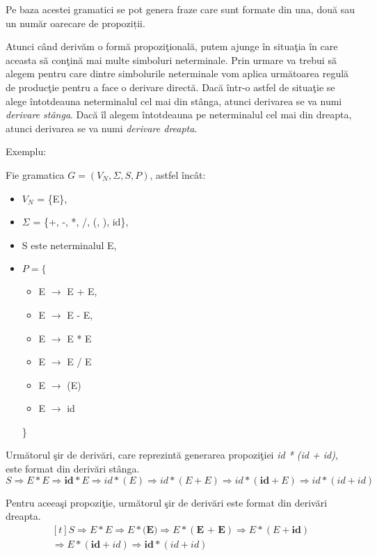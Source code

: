 Pe baza acestei gramatici se pot genera fraze care sunt formate din una, două sau un număr oarecare de propoziții.

Atunci când derivăm o formă propoziţională, putem ajunge în situaţia în care aceasta să conţină mai multe simboluri neterminale. Prin urmare va trebui să alegem pentru care dintre simbolurile neterminale vom aplica următoarea regulă de producţie pentru a face o derivare directă. Dacă într-o astfel de situaţie se alege întotdeauna neterminalul cel mai din stânga, atunci derivarea se va numi \textit{derivare stânga}. Dacă îl alegem întotdeauna pe neterminalul cel mai din dreapta, atunci derivarea se va numi \textit{derivare dreapta}.

Exemplu: 

Fie gramatica $G = (V_{N}, \Sigma, S, P)$, astfel încât:

\begin{itemize}
\item
$V_{N}$ = \{E\},
\item
$\Sigma$ = \{+, -, *, /, (, ), id\},
\item
S este neterminalul E,
\item
$P = \{$
\begin{itemize}
\item
E $\rightarrow$ E + E,
\item
E $\rightarrow$ E - E,
\item
E $\rightarrow$ E * E
\item
E $\rightarrow$ E / E
\item
E $\rightarrow$ (E)
\item
E $\rightarrow$ id
\end{itemize}
\}
\end{itemize}

Următorul şir de derivări, care reprezintă generarea propoziţiei \textit{id * (id + id)}, este format din derivări stânga.
\[ S \Rightarrow E * E \Rightarrow \textbf{id} * E \Rightarrow id * (E) \Rightarrow id * (E + E) \Rightarrow id * ( \textbf{id} + E) \Rightarrow id * ( id + id) \]

Pentru aceeaşi propoziţie, următorul şir de derivări este format din derivări dreapta.
\[\begin{multlined}[t]
S \Rightarrow E * E \Rightarrow E * \textbf{(E)} \Rightarrow E * (\textbf{E + E}) \Rightarrow E * (E + \textbf{id}) \\ \Rightarrow E * ( \textbf{id} + id) \Rightarrow \textbf{id} * ( id + id)
\end{multlined}\]

